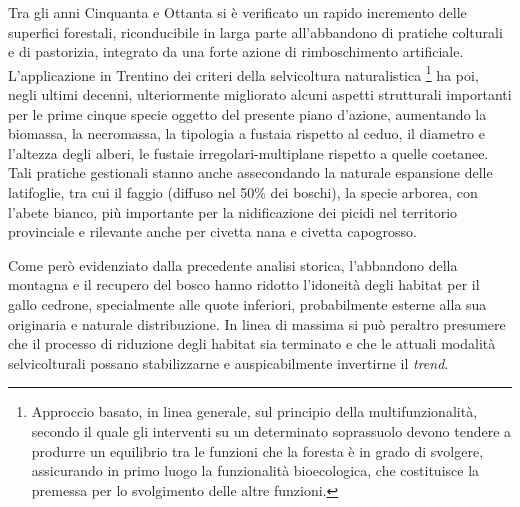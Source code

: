 \documentclass[10pt,twoside,openany,x11names,svgnames,italian,a5paper,dvipsnames,table]{memoir}
\begin{document}
Tra gli anni Cinquanta e Ottanta si è verificato un rapido incremento delle superfici forestali, riconducibile in larga parte all’abbandono di pratiche colturali e di pastorizia, integrato da una forte azione di rimboschimento artificiale. L’applicazione in Trentino dei criteri della selvicoltura naturalistica \footnote{Approccio basato, in linea generale, sul principio della multifunzionalità, secondo il quale gli interventi su un determinato soprassuolo devono tendere a produrre un equilibrio tra le funzioni che la foresta è in grado di svolgere, assicurando in primo luogo la funzionalità bioecologica, che costituisce la premessa per lo svolgimento delle altre funzioni.} ha poi, negli ultimi decenni, ulteriormente migliorato alcuni aspetti strutturali importanti per le prime cinque specie oggetto del presente piano d’azione, aumentando la biomassa, la necromassa, la tipologia a fustaia rispetto al ceduo, il diametro e l’altezza degli alberi, le fustaie irregolari-multiplane rispetto a quelle coetanee. Tali pratiche gestionali stanno anche assecondando la naturale espansione delle latifoglie, tra cui il faggio (diffuso nel 50\% dei boschi), la specie arborea, con l’abete bianco, più importante per la nidificazione dei picidi nel territorio provinciale e rilevante anche per civetta nana e civetta capogrosso. 

Come però evidenziato dalla precedente analisi storica, l’abbandono della montagna e il recupero del bosco hanno ridotto l’idoneità degli habitat per il gallo cedrone, specialmente alle quote inferiori, probabilmente esterne alla sua originaria e naturale distribuzione. In linea di massima si può peraltro presumere che il processo di riduzione degli habitat sia terminato e che le attuali modalità selvicolturali possano stabilizzarne e auspicabilmente invertirne il \emph{trend}. 
\end{document}
